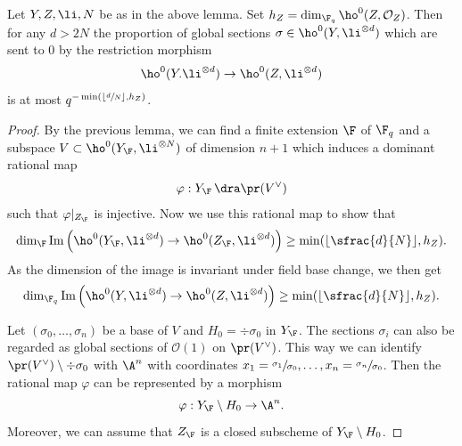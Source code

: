 \begin{lem}\label{hi}
Let $Y,Z,\li,N$ be as in the above lemma.
Set $h_Z=\dim_{\F_q}\ho^0(Z, \mathcal{O}_Z)$. Then for any $d>2N$ the proportion of global sections $\sigma\in \ho^0(Y, \li^{\otimes d})$ which are sent to $0$ by the restriction morphism
\[
\ho^0(Y. \li^{\otimes d}) \to \ho^0(Z, \li^{\otimes d})
\]
is at most $q^{-\min(\lfloor\sfrac{d}{N}\rfloor, h_Z)}$.
\end{lem}
\begin{proof}
By the previous lemma, we can find a finite extension $\F$ of $\F_q$ and a subspace $V\subset \ho^0(Y_\F, \li^{\otimes N})$ of dimension $n+1$ which induces a dominant rational map\vspace*{-3pt}
\[
\varphi: Y_{\F}\,\dra \pr(V^{\vee})
\]
such that $\varphi|_{Z_{\F}}$ is injective. Now we use this rational map to show that\vspace*{-3pt}
\[
\dim_\F\mathrm{Im}\left(\ho^0(Y_\F, \li^{\otimes d})\to \ho^0(Z_{\F}, \li^{\otimes d}) \right)\geq \min(\lfloor\sfrac{d}{N}\rfloor, h_Z).
\]
As the dimension of the image is invariant under field base change, we then get\vspace*{-3pt}
\[
\dim_{\F_q}\mathrm{Im}\left(\ho^0(Y, \li^{\otimes d})\to \ho^0(Z, \li^{\otimes d}) \right)\geq \min(\lfloor\sfrac{d}{N}\rfloor, h_Z).
\]

Let $(\sigma_0,\dots, \sigma_n)$ be a base of $V$ and $H_0=\div \sigma_0$ in $Y_{\F}$. The sections $\sigma_i$ can also be regarded as global sections of $\mathcal{O}(1)$ on $\pr(V^{\vee})$. This way we can identify $\pr(V^{\vee})\setminus\div \sigma_0$ with $\A^n$ with coordinates $x_1=\sfrac{\sigma_1}{\sigma_0},\dots, x_n=\sfrac{\sigma_n}{\sigma_0}$. Then the rational map $\varphi$ can be represented by a morphism\vspace*{-3pt}
\[
\varphi: Y_{\F}\setminus H_0 \to \A^n.
\]
Moreover, we can assume that $Z_{\F}$ is a closed subscheme of $Y_{\F}\setminus H_0$.


\end{proof}
